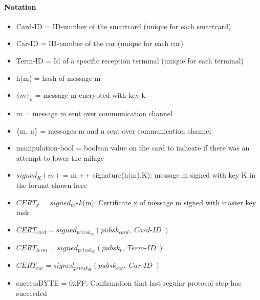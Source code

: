 \documentclass[a4paper]{article}
\newcommand{\escapevariablewithdashinmathmode}[1]{{\operatorname{\mathit{#1}}}}
\begin{document}
\paragraph{Notation}
\begin{itemize}
    \item Card-ID = ID-number of the smartcard (unique for each smartcard)
    \item Car-ID = ID-number of the car (unique for each car)
    \item Term-ID = Id of a specific reception terminal (unique for each terminal)
    \item h(m) = hash of message m
    \item $\{m\}_{k}$ = message m encrypted with key k
    \item m = message m sent over communication channel
    \item \{m, n\} = messages m and n sent over communication channel
    \item manipulation-bool = boolean value on the card to indicate if there was an attempt to lower the milage
    \item $signed_K(m)$ = m ++ signature(h(m),K): message m signed with key K in the format shown here
    \item $CERT_x$ = $signed_msk$(m): Certificate x of message m signed with master key msk
    \item $CERT_{card} = signed_{privsk_{db}}(pubsk_{card}, \escapevariablewithdashinmathmode{Card-ID})$
    \item $CERT_{term} = signed_{privsk_{db}}(pubsk_t, \escapevariablewithdashinmathmode{Term-ID})$
    \item $CERT_{car} = signed_{privsk_{db}}(pubsk_{car}, \escapevariablewithdashinmathmode{Car-ID})$
    \item successBYTE = 0xFF: Confirmation that last regular protocol step has succeeded
\end{itemize}

\end{document}
